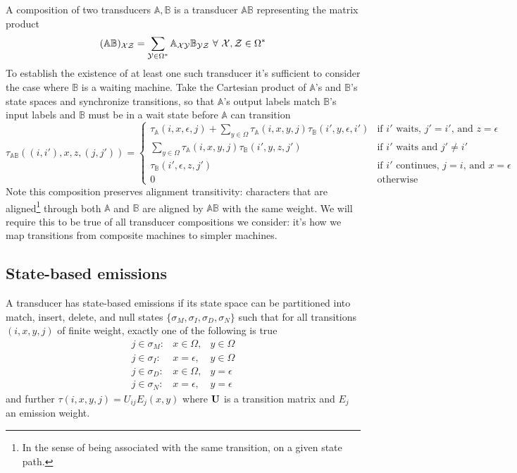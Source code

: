 \documentclass{article}
\begin{document}
A composition of two transducers $\mathbb{A},\mathbb{B}$ is a transducer $\mathbb{AB}$ representing the matrix product
\[
(\mathbb{AB})_{{\cal XZ}} = \sum_{{\cal Y} \in \Omega^\ast} \mathbb{A}_{\cal XY} \mathbb{B}_{\cal YZ} \ \forall\ {\cal X},{\cal Z} \in \Omega^\ast
\]
To establish the existence of at least one such transducer it's sufficient to consider the case where $\mathbb{B}$ is a waiting machine.
Take the Cartesian product of $\mathbb{A}$'s and $\mathbb{B}$'s state spaces and synchronize transitions,
so that $\mathbb{A}$'s output labels match $\mathbb{B}$'s input labels and $\mathbb{B}$ must be in a wait state before $\mathbb{A}$ can transition
\[
  \tau_{\mathbb{AB}}((i,i'),x,z,(j,j')) = \left\{
  \begin{array}{ll}
    \tau_{\mathbb{A}}(i,x,\epsilon,j) + \displaystyle \sum_{y \in \Omega} \tau_{\mathbb{A}}(i,x,y,j) \tau_{\mathbb{B}}(i',y,\epsilon,i') & \mbox{if $i'$ waits, $j' = i'$, and $z = \epsilon$} \\
    \displaystyle \sum_{y \in \Omega} \tau_{\mathbb{A}}(i,x,y,j) \tau_{\mathbb{B}}(i',y,z,j') & \mbox{if $i'$ waits and $j' \neq i'$} \\
    \tau_{\mathbb{B}}(i',\epsilon,z,j') & \mbox{if $i'$ continues, $j = i$, and $x = \epsilon$} \\
    0 & \mbox{otherwise}
  \end{array} \right.
\]
Note this composition preserves alignment transitivity: characters that are aligned\footnote{In the sense of being associated with the same transition, on a given state path.}
through both $\mathbb{A}$ and $\mathbb{B}$ are aligned by $\mathbb{AB}$ with the same weight.
We will require this to be true of all transducer compositions we consider:
it's how we map transitions from composite machines to simpler machines.

\subsection{State-based emissions}

A transducer has state-based emissions if its state space can be partitioned into
match, insert, delete, and null states $\{ \sigma_M, \sigma_I, \sigma_D, \sigma_N \}$
such that for all transitions $(i,x,y,j)$ of finite weight, exactly one of the following is true
\begin{eqnarray*}
  j \in \sigma_M: & x \in \Omega, & y \in \Omega \\
  j \in \sigma_I: & x = \epsilon, & y \in \Omega \\
  j \in \sigma_D: & x \in \Omega, & y = \epsilon \\
  j \in \sigma_N: & x = \epsilon, & y = \epsilon
\end{eqnarray*}
and further $\tau(i,x,y,j) = U_{ij} E_j(x,y)$ where ${\bf U}$ is a transition matrix and $E_j$ an emission weight.
\end{document}
